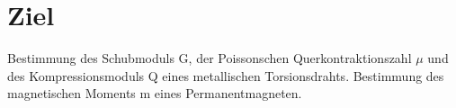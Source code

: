 \section{Ziel}
\label{sec:ziel}

Bestimmung des Schubmoduls G, der Poissonschen Querkontraktionszahl \(\mu\) und des Kompressionsmoduls Q eines metallischen Torsionsdrahts.
Bestimmung des magnetischen Moments m eines Permanentmagneten.